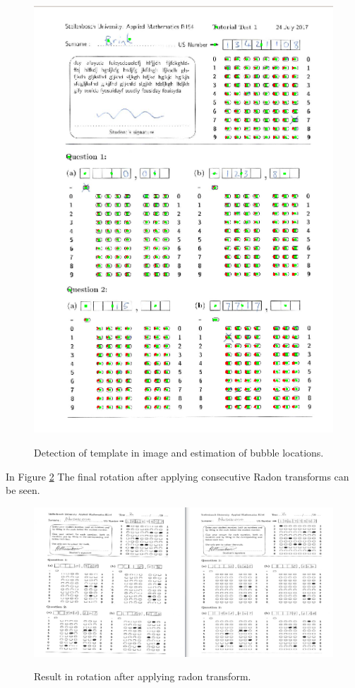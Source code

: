 \begin{figure}
  \centering
  \includegraphics[width=14cm]{FinalEstimate}\\
  \caption{Detection of template in image and estimation of bubble locations.}
  \label{fig:FinalEstimate}
\end{figure}

In Figure \ref{fig:rotate} The final rotation after applying consecutive Radon transforms can be seen.

\begin{figure}
  \centering
  \includegraphics[width=14cm]{Rotation}\\
  \caption{Result in rotation after applying radon transform.}
  \label{fig:rotate}
\end{figure}

